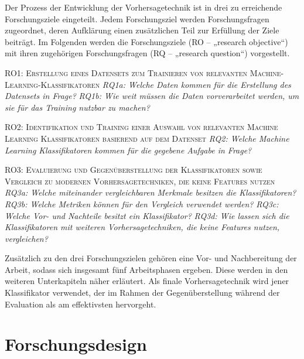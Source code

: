 Der Prozess der Entwicklung der Vorhersagetechnik ist in drei zu erreichende Forschungsziele eingeteilt. Jedem Forschungsziel werden Forschungsfragen zugeordnet, deren Aufklärung einen zusätzlichen Teil zur Erfüllung der Ziele beiträgt. Im Folgenden werden die Forschungsziele (RO – „research objective“) mit ihren zugehörigen Forschungsfragen (RQ – „research question“) vorgestellt.

\begin{flushleft}
\textsc{RO1: Erstellung eines Datensets zum Trainieren von relevanten Machine-
Learning-Klassifikatoren}\medskip\linebreak 
\emph{RQ1a: Welche Daten kommen für die Erstellung des Datensets in Frage?}\linebreak
\emph{RQ1b: Wie weit müssen die Daten vorverarbeitet werden, um sie für das Training nutzbar zu machen?}

\textsc{RO2: Identifikation und Training einer Auswahl von relevanten Machine Learning Klassifikatoren basierend auf dem Datenset}\medskip\linebreak 
\emph{RQ2: Welche Machine Learning Klassifikatoren kommen für die gegebene Aufgabe in Frage?}

\textsc{RO3: Evaluierung und Gegenüberstellung der Klassifikatoren sowie Vergleich zu modernen Vorhersagetechniken, die keine Features nutzen}\medskip\linebreak 
\emph{RQ3a: Welche miteinander vergleichbaren Merkmale besitzen die Klassifikatoren?}\linebreak 
\emph{RQ3b: Welche Metriken können für den Vergleich verwendet werden?}\linebreak 
\emph{RQ3c: Welche Vor- und Nachteile besitzt ein Klassifikator?}\linebreak 
\emph{RQ3d: Wie lassen sich die Klassifikatoren mit weiteren Vorhersagetechniken, die keine Features nutzen, vergleichen?}
\end{flushleft}
Zusätzlich zu den drei Forschungszielen gehören eine Vor- und Nachbereitung der Arbeit, sodass sich insgesamt fünf Arbeitsphasen ergeben. Diese werden in den weiteren Unterkapiteln näher erläutert. Als finale Vorhersagetechnik wird jener Klassifikator verwendet, der im Rahmen der Gegenüberstellung während der Evaluation als am effektivsten hervorgeht.

\section{Forschungsdesign}

